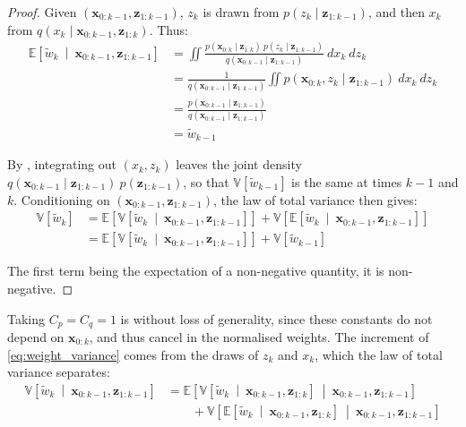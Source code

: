 \begin{proof}
	Given $(\mathbf{x}_{0:k-1},\mathbf{z}_{1:k-1})$, $z_k$ is drawn from $p(z_k\mid\mathbf{z}_{1:k-1})$, and then $x_k$ from $q(x_k\mid\mathbf{x}_{0:k-1},\mathbf{z}_{1:k})$. Thus:
	\begin{equation}
		\begin{aligned}
		\mathbb{E}\left[\tilde{w}_k\:\middle|\:\mathbf{x}_{0:k-1},\mathbf{z}_{1:k-1}\right]&=\iint{\frac{p(\mathbf{x}_{0:k}\mid\mathbf{z}_{1:k})\:p(z_k\mid\mathbf{z}_{1:k-1})}{q(\mathbf{x}_{0:k-1}\mid\mathbf{z}_{1:k-1})}\:dx_k\:dz_k}\\
		&=\frac{1}{q(\mathbf{x}_{0:k-1}\mid\mathbf{z}_{1:k-1})}\iint{p(\mathbf{x}_{0:k},z_k\mid\mathbf{z}_{1:k-1})\:dx_k\:dz_k}\\
		&=\frac{p(\mathbf{x}_{0:k-1}\mid\mathbf{z}_{1:k-1})}{q(\mathbf{x}_{0:k-1}\mid\mathbf{z}_{1:k-1})}\\
		&=\tilde{w}_{k-1}
		\end{aligned}
	\end{equation}

	By , integrating out $(x_k,z_k)$ leaves the joint density $q(\mathbf{x}_{0:k-1}\mid\mathbf{z}_{1:k-1})\:p(\mathbf{z}_{1:k-1})$, so that $\mathbb{V}[\tilde{w}_{k-1}]$ is the same at times $k-1$ and $k$. Conditioning on $(\mathbf{x}_{0:k-1},\mathbf{z}_{1:k-1})$, the law of total variance then gives:
	\begin{equation}
		\begin{aligned}
		\mathbb{V}\left[\tilde{w}_k\right]&=\mathbb{E}\left[\mathbb{V}\left[\tilde{w}_k\:\middle|\:\mathbf{x}_{0:k-1},\mathbf{z}_{1:k-1}\right]\right]+\mathbb{V}\left[\mathbb{E}\left[\tilde{w}_k\:\middle|\:\mathbf{x}_{0:k-1},\mathbf{z}_{1:k-1}\right]\right]\\
		&=\mathbb{E}\left[\mathbb{V}\left[\tilde{w}_k\:\middle|\:\mathbf{x}_{0:k-1},\mathbf{z}_{1:k-1}\right]\right]+\mathbb{V}\left[\tilde{w}_{k-1}\right]
		\end{aligned}
	\end{equation}

	The first term being the expectation of a non-negative quantity, it is non-negative.
\end{proof}

Taking $C_p=C_q=1$ is without loss of generality, since these constants do not depend on $\mathbf{x}_{0:k}$, and thus cancel in the normalised weights. The increment of \eqref{eq:weight_variance} comes from the draws of $z_k$ and $x_k$, which the law of total variance separates:
\begin{equation}
	\begin{aligned}
	\mathbb{V}\left[\tilde{w}_k\:\middle|\:\mathbf{x}_{0:k-1},\mathbf{z}_{1:k-1}\right]&=\mathbb{E}\left[\mathbb{V}\left[\tilde{w}_k\:\middle|\:\mathbf{x}_{0:k-1},\mathbf{z}_{1:k}\right]\:\middle|\:\mathbf{x}_{0:k-1},\mathbf{z}_{1:k-1}\right]\\
	&\qquad+\mathbb{V}\left[\mathbb{E}\left[\tilde{w}_k\:\middle|\:\mathbf{x}_{0:k-1},\mathbf{z}_{1:k}\right]\:\middle|\:\mathbf{x}_{0:k-1},\mathbf{z}_{1:k-1}\right]
	\end{aligned}\label{eq:weight_variance_increment}
\end{equation}

